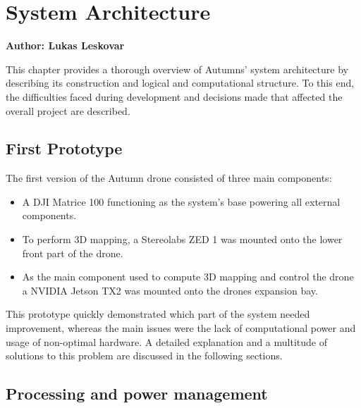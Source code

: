 \chapter{System Architecture}
\label{chapter:architecture}

\textbf{Author: Lukas Leskovar} 

This chapter provides a thorough overview of Autumns' system architecture by describing its construction and logical and computational structure. To this end, the difficulties faced during development and decisions made that affected the overall project are described.

\section{First Prototype}
The first version of the Autumn drone consisted of three main components:
\begin{itemize}
	\item A DJI Matrice 100 functioning as the system's base powering all external components.
	\item To perform 3D mapping, a Stereolabs ZED 1 was mounted onto the lower front part of the drone.
	\item As the main component used to compute 3D mapping and control the drone a NVIDIA Jetson TX2 was mounted onto the drones expansion bay.
\end{itemize}
This prototype quickly demonstrated which part of the system needed improvement, whereas the main issues were the lack of computational power and usage of non-optimal hardware. A detailed explanation and a multitude of solutions to this problem are discussed in the following sections.


\section{Processing and power management}


